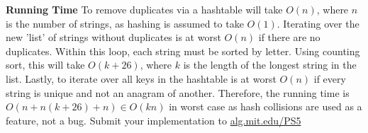 \documentclass[12pt,twoside]{article}
\begin{document}
\begin{problems}
\begin{problemparts}
    {\bf Running Time} To remove duplicates via a hashtable will take $O(n)$,
    where $n$ is the number of strings, as hashing is assumed to take $O(1)$.
    Iterating over the new 'list' of strings without duplicates is at worst
    $O(n)$ if there are no duplicates. Within this loop, each string must be
    sorted by letter. Using counting sort, this will take $O(k + 26)$, where
    $k$ is the length of the longest string in the list. Lastly, to iterate
    over all keys in the hashtable is at worst $O(n)$ if every string is
    unique and not an anagram of another. Therefore, the running time is $
    O(n + n(k + 26) + n) \in O(kn) $ in worst case as hash collisions are
    used as a feature, not a bug.
\problempart Submit your implementation to {\small\url{alg.mit.edu/PS5}}
\end{problemparts}

\end{problems}
\end{document}
